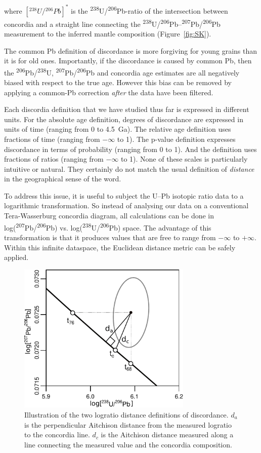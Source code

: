 \documentclass[gchron, manuscript]{copernicus}
\begin{document}
\noindent where $[{}^{238}U/{}^{206}Pb]^\ast$ is the
\textsuperscript{238}U/\textsuperscript{206}Pb-ratio of the
intersection between concordia and a straight line connecting the
\textsuperscript{238}U/\textsuperscript{206}Pb--\textsuperscript{207}Pb/\textsuperscript{206}Pb
measurement to the inferred mantle composition (Figure~\ref{fig:SK}).

The common Pb definition of discordance is more forgiving for young
grains than it is for old ones. Importantly, if the discordance is
caused by common Pb, then the
\textsuperscript{206}Pb/\textsuperscript{238}U,
\textsuperscript{207}Pb/\textsuperscript{206}Pb and concordia age
estimates are all negatively biased with respect to the true
age. However this bias can be removed by applying a common-Pb
correction \emph{after} the data have been filtered.

Each discordia definition that we have studied thus far is expressed
in different units. For the absolute age definition, degrees of
discordance are expressed in units of time (ranging from 0 to
4.5~Ga). The relative age definition uses fractions of time (ranging
from $-\infty$ to 1). The p-value definition expresses discordance in
terms of probability (ranging from 0 to 1). And the \citet{stacey1975}
definition uses fractions of ratios (ranging from $-\infty$ to
1). None of these scales is particularly intuitive or natural. They
certainly do not match the usual definition of \emph{distance} in the
geographical sense of the word.

To address this issue, it is useful to subject the U--Pb isotopic
ratio data to a logarithmic transformation. So instead of analysing
our data on a conventional Tera-Wasserburg concordia diagram, all
calculations can be done in
log(\textsuperscript{207}Pb/\textsuperscript{206}Pb) vs.
log(\textsuperscript{238}U/\textsuperscript{206}Pb) space. The
advantage of this transformation is that it produces values that are
free to range from $-\infty$ to $+\infty$. Within this infinite
dataspace, the Euclidean distance metric can be safely applied.

\begin{figure}
  \includegraphics[width=8.3cm]{Aitchison.pdf}
  \caption{Illustration of the two logratio distance definitions of
    discordance. $d_a$ is the perpendicular Aitchison distance from
    the measured logratio to the concordia line. $d_c$ is the
    Aitchison distance measured along a line connecting the measured
    value and the concordia composition.
  }
  \label{fig:aitchison}
\end{figure}
\end{document}
